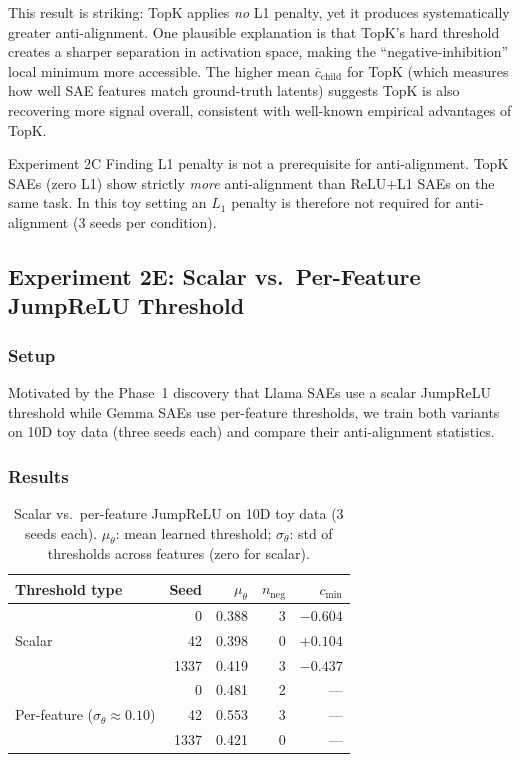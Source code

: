 \documentclass[11pt,a4paper]{article}
\newcommand{\nneg}{n_{\mathrm{neg}}}
\begin{document}
This result is striking: TopK applies \emph{no} L1 penalty, yet it produces systematically
greater anti-alignment.  One plausible explanation is that TopK's hard threshold creates a
sharper separation in activation space, making the ``negative-inhibition'' local minimum
more accessible.  The higher mean $\bar{c}_{\mathrm{child}}$ for TopK (which measures
how well SAE features match ground-truth latents) suggests TopK is also recovering more
signal overall, consistent with well-known empirical advantages of TopK.

\begin{finding}{Experiment 2C Finding}
L1 penalty is not a prerequisite for anti-alignment.  TopK SAEs (zero L1) show strictly
\emph{more} anti-alignment than ReLU+L1 SAEs on the same task.  In this toy setting an
$L_1$ penalty is therefore not required for anti-alignment (3 seeds per condition).
\end{finding}

\subsection{Experiment 2E: Scalar vs.\ Per-Feature JumpReLU Threshold}
\label{sec:2e}

\subsubsection{Setup}
Motivated by the Phase~1 discovery that Llama SAEs use a scalar JumpReLU threshold
while Gemma SAEs use per-feature thresholds, we train both variants on 10D toy data
(three seeds each) and compare their anti-alignment statistics.

\subsubsection{Results}

\begin{table}[H]
\centering
\caption{Scalar vs.\ per-feature JumpReLU on 10D toy data (3 seeds each).  $\mu_\theta$:
mean learned threshold; $\sigma_\theta$: std of thresholds across features (zero for scalar).}
\label{tab:jumprelu}
\begin{tabular}{@{}lrrrr@{}}
\toprule
Threshold type & Seed & $\mu_\theta$ & $\nneg$ & $c_{\min}$\\
\midrule
\multirow{3}{*}{Scalar} & 0    & 0.388 & 3 & $-0.604$\\
                         & 42   & 0.398 & 0 & $+0.104$\\
                         & 1337 & 0.419 & 3 & $-0.437$\\
\midrule
\multirow{3}{*}{Per-feature ($\sigma_\theta \approx 0.10$)} & 0    & 0.481 & 2 & ---\\
                                                              & 42   & 0.553 & 3 & ---\\
                                                              & 1337 & 0.421 & 0 & ---\\
\bottomrule
\end{tabular}
\end{table}
\end{document}
